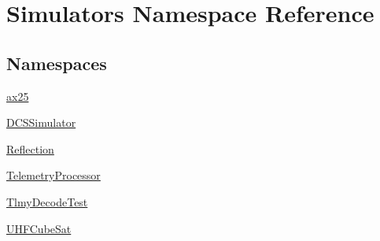 \hypertarget{namespace_simulators}{}\section{Simulators Namespace Reference}
\label{namespace_simulators}
\subsection*{Namespaces}
\begin{DoxyCompactItemize}
\item 
 \hyperlink{namespace_simulators_1_1ax25}{ax25}
\item 
 \hyperlink{namespace_simulators_1_1_d_c_s_simulator}{D\+C\+S\+Simulator}
\item 
 \hyperlink{namespace_simulators_1_1_reflection}{Reflection}
\item 
 \hyperlink{namespace_simulators_1_1_telemetry_processor}{Telemetry\+Processor}
\item 
 \hyperlink{namespace_simulators_1_1_tlmy_decode_test}{Tlmy\+Decode\+Test}
\item 
 \hyperlink{namespace_simulators_1_1_u_h_f_cube_sat}{U\+H\+F\+Cube\+Sat}
\end{DoxyCompactItemize}
